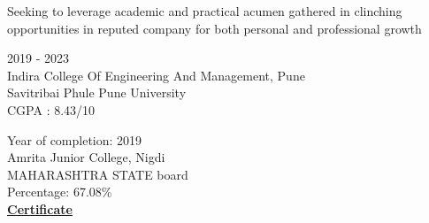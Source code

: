 \documentclass[a4paper,10pt]{memoir} %
\begin{document}
\userinformation %

\framebreak %






{Seeking to leverage academic and practical acumen gathered in clinching opportunities in reputed company for both personal and professional growth}\\





{2019 - 2023}\\
{Indira College Of Engineering And Management, Pune}\\
{Savitribai Phule Pune University}\\
CGPA : 8.43/10\\




{Year of completion: 2019}\\
{Amrita Junior College, Nigdi}\\
{MAHARASHTRA STATE board}\\
Percentage: 67.08\% \\
\textbf{\href{https://drive.google.com/file/d/1Y_d1f7XW1VYKLRC9zUc6Hj5_W-hmOaE0/view?usp=sharing}{Certificate}}\\
\end{document}
